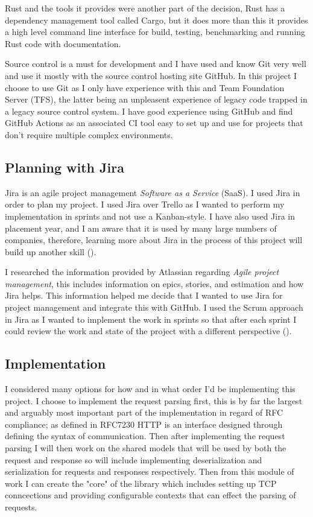 \documentclass[12pt, a4paper]{article}
\begin{document}
Rust and the tools it provides were another part of the decision, Rust has a dependency management
tool called Cargo, but it does more than this it provides a high level command line interface for 
build, testing, benchmarking and running Rust code with documentation.

Source control is a must for development and I have used and know Git very well and use it mostly
with the source control hosting site GitHub. In this project I choose to use Git as I only have
experience with this and Team Foundation Server (TFS), the latter being an unpleasent experience of
legacy code trapped in a legacy source control system. I have good experience using GitHub and
find GitHub Actions as an associated CI tool easy to set up and use for projects that don't require
multiple complex environments. 

\subsection{Planning with Jira}

Jira is an agile project management \emph{Software as a Service} (SaaS). I used Jira in order to
plan my project. I used Jira over Trello as I wanted to perform my implementation in
sprints and not use a Kanban-style. I have also used Jira in placement year, and I am aware that it 
is used by many large numbers of companies, therefore, learning more about Jira in the process of this 
project will build up another skill (\cite{jira}).

I researched the information provided by Atlassian regarding \emph{Agile project management},
this includes information on epics, stories, and estimation and how Jira helps. This information
helped me decide that I wanted to use Jira for project management and integrate this with GitHub.
I used the Scrum approach in Jira as I wanted to implement the work in sprints so that after each
sprint I could review the work and state of the project with a different perspective
(\cite{jira-agile-info}). 

\subsection{Implementation} \label{ssec:implementation}

I considered many options for how and in what order I'd be implementing this project. I choose
to implement the request parsing first, this is by far the largest and arguably most important part
of the implementation in regard of RFC compliance; as defined in RFC7230 HTTP is an interface designed
through defining the syntax of communication. Then after implementing the request parsing I will then
work on the shared models that will be used by both the request and response so will include implementing
deserialization and serialization for requests and responses respectively. Then from this module of
work I can create the "core" of the library which includes setting up TCP conncections and providing
configurable contexts that can effect the parsing of requests. 
\end{document}
